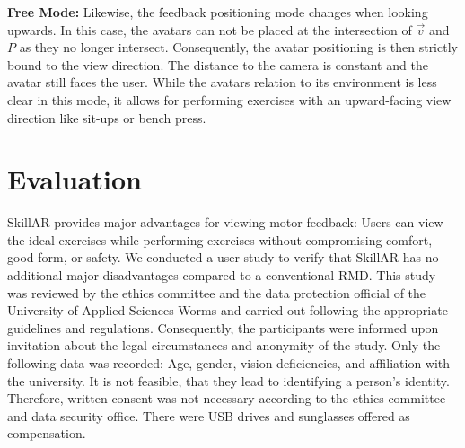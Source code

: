\textbf{Free Mode:}
Likewise, the feedback positioning mode changes when looking upwards. In this case, the avatars can not be placed at the intersection of $\vec{v}$ and $P$ as they no longer intersect. Consequently, the avatar positioning is then strictly bound to the view direction. The distance to the camera is constant and the avatar still faces the user. While the avatars relation to its environment is less clear in this mode, it allows for performing exercises with an upward-facing view direction like sit-ups or bench press.

\section{Evaluation}
SkillAR provides major advantages for viewing motor feedback: Users can view the ideal exercises while performing exercises without compromising comfort, good form, or safety. We conducted a user study to verify that SkillAR has no additional major disadvantages compared to a conventional RMD. This study was reviewed by the ethics committee and the data protection official of the University of Applied Sciences Worms and carried out following the appropriate guidelines and regulations. Consequently, the participants were informed upon invitation about the legal circumstances and anonymity of the study. Only the following data was recorded: Age, gender, vision deficiencies, and affiliation with the university. It is not feasible, that they lead to identifying a person's identity. Therefore, written consent was not necessary according to the ethics committee and data security office. There were USB drives and sunglasses offered as compensation.

